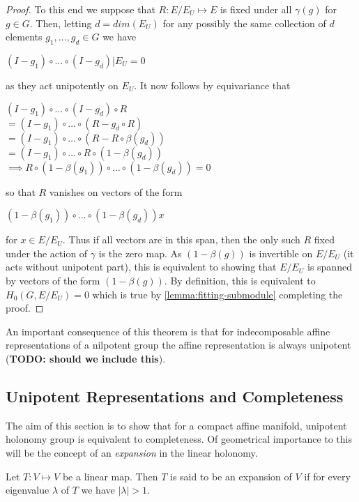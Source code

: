 \begin{proof}
    To this end we suppose that $R: E/E_U \mapsto E$ is fixed under all $\gamma(g)$
    for $g\in G$. Then, letting $d=dim(E_U)$ for any possibly the same collection
    of $d$ elements $g_1, \dots, g_d \in G$ we have
    \begin{center}
        $(I-g_1)\circ \dots \circ (I-g_d)|{E_U} = 0$
    \end{center}
    as they act unipotently on $E_U$. It now follows by equivariance that
    \begin{center}
        $(I-g_1)\circ \dots \circ (I-g_d) \circ R$\\
        $= (I-g_1)\circ \dots \circ (R-g_d \circ R)$\\
        $= (I-g_1)\circ \dots \circ (R-R \circ \beta(g_d))$\\
        $= (I-g_1)\circ \dots \circ R \circ(1- \beta(g_d))$\\
        $\implies R \circ (1 - \beta(g_1))\circ \dots \circ (1- \beta(g_d)) = 0$
    \end{center}
    so that $R$ vanishes on vectors of the form
    \begin{center}
        $(1 - \beta(g_1))\circ \dots \circ (1- \beta(g_d))x$
    \end{center}
    for $x \in E/E_U$. Thus if all vectors are in this span, then the only such $R$ fixed under the action of $\gamma$ is the
    zero map. As $(1 - \beta(g))$ is invertible on $E/E_U$ (it acts without unipotent part), this is equivalent to
    showing that $E/E_U$ is spanned by vectors of the form $(1 - \beta(g))$. By definition, this is equivalent to
    $H_0(G, E/E_U)= 0$ which is true by \ref{lemma:fitting-submodule} completing the proof.
\end{proof}

An important consequence of this theorem is that for indecomposable affine
representations of a nilpotent group the affine representation is always
unipotent (\textbf{TODO: should we include this}).

\subsection{Unipotent Representations and Completeness}

The aim of this section is to show that for a compact affine manifold,
unipotent holonomy group is equivalent to completeness. Of geometrical
importance to this will be the concept of an \textit{expansion} in the linear
holonomy.

\begin{definition}[Expansion]
    Let $T: V \mapsto V$ be a linear map. Then $T$ is said to be an expansion of $V$ if for every eigenvalue
    $\lambda$ of $T$ we have $|\lambda|>1$.
\end{definition}

